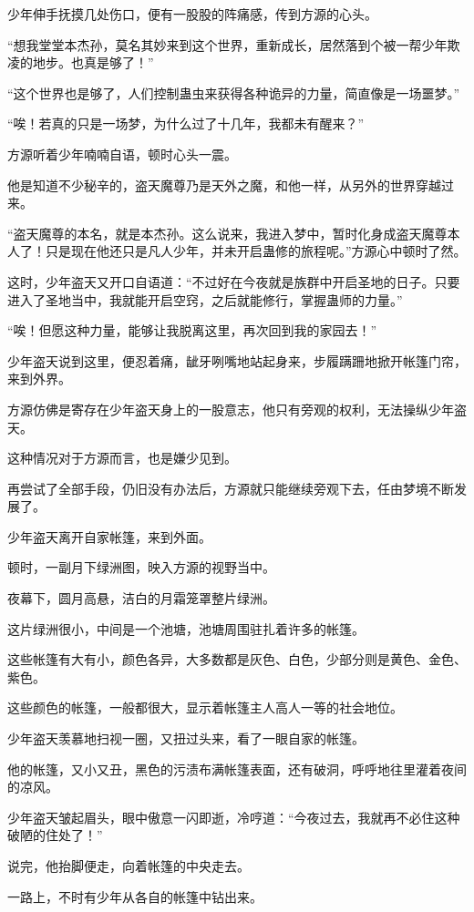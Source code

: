 \begin{this_body}
少年伸手抚摸几处伤口，便有一股股的阵痛感，传到方源的心头。

“想我堂堂本杰孙，莫名其妙来到这个世界，重新成长，居然落到个被一帮少年欺凌的地步。也真是够了！”

“这个世界也是够了，人们控制蛊虫来获得各种诡异的力量，简直像是一场噩梦。”

“唉！若真的只是一场梦，为什么过了十几年，我都未有醒来？”

方源听着少年喃喃自语，顿时心头一震。

他是知道不少秘辛的，盗天魔尊乃是天外之魔，和他一样，从另外的世界穿越过来。

“盗天魔尊的本名，就是本杰孙。这么说来，我进入梦中，暂时化身成盗天魔尊本人了！只是现在他还只是凡人少年，并未开启蛊修的旅程呢。”方源心中顿时了然。

这时，少年盗天又开口自语道：“不过好在今夜就是族群中开启圣地的日子。只要进入了圣地当中，我就能开启空窍，之后就能修行，掌握蛊师的力量。”

“唉！但愿这种力量，能够让我脱离这里，再次回到我的家园去！”

少年盗天说到这里，便忍着痛，龇牙咧嘴地站起身来，步履蹒跚地掀开帐篷门帘，来到外界。

方源仿佛是寄存在少年盗天身上的一股意志，他只有旁观的权利，无法操纵少年盗天。

这种情况对于方源而言，也是嫌少见到。

再尝试了全部手段，仍旧没有办法后，方源就只能继续旁观下去，任由梦境不断发展了。

少年盗天离开自家帐篷，来到外面。

顿时，一副月下绿洲图，映入方源的视野当中。

夜幕下，圆月高悬，洁白的月霜笼罩整片绿洲。

这片绿洲很小，中间是一个池塘，池塘周围驻扎着许多的帐篷。

这些帐篷有大有小，颜色各异，大多数都是灰色、白色，少部分则是黄色、金色、紫色。

这些颜色的帐篷，一般都很大，显示着帐篷主人高人一等的社会地位。

少年盗天羡慕地扫视一圈，又扭过头来，看了一眼自家的帐篷。

他的帐篷，又小又丑，黑色的污渍布满帐篷表面，还有破洞，呼呼地往里灌着夜间的凉风。

少年盗天皱起眉头，眼中傲意一闪即逝，冷哼道：“今夜过去，我就再不必住这种破陋的住处了！”

说完，他抬脚便走，向着帐篷的中央走去。

一路上，不时有少年从各自的帐篷中钻出来。


\end{this_body}
